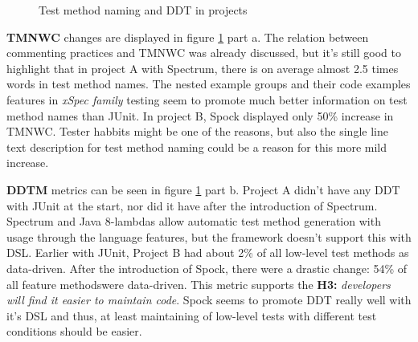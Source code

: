     \begin{figure}[H]%
        \centering
        \qquad
        \caption{Test method naming and DDT in projects}%
        \label{fig:tmnwc-ddtm}%
    \end{figure}

\textbf{TMNWC} changes are displayed in figure \ref{fig:tmnwc-ddtm} part a. The relation between commenting practices
and TMNWC was already discussed, but it's still good to highlight that in project A with Spectrum, there is on average
almost 2.5 times words in test method names. The nested example groups and their code examples features in \textit{xSpec family} testing
seem to promote much better information on test method names than JUnit. In project B, Spock displayed only 50\% increase in TMNWC.
Tester habbits might be one of the reasons, but also the single line text description for test method naming could be a
reason for this more mild increase.

\textbf{DDTM} metrics can be seen in figure \ref{fig:tmnwc-ddtm} part b. Project A didn't have any DDT with JUnit at the start,
nor did it have after the introduction of Spectrum. Spectrum and Java 8-lambdas allow automatic test method generation with
usage through the language features, but the framework doesn't support this with DSL. Earlier with JUnit, Project B had about 2\% of
all low-level test methods as data-driven. After the introduction of Spock, there were a drastic change:
 54\% of all
feature methods\restoregeometry \noindent were data-driven. This metric supports the \textbf{H3:} \textit{developers will find it easier to maintain code}.
Spock seems to promote DDT really well with it's DSL and thus, at least maintaining of low-level tests with different
test conditions should be easier.

